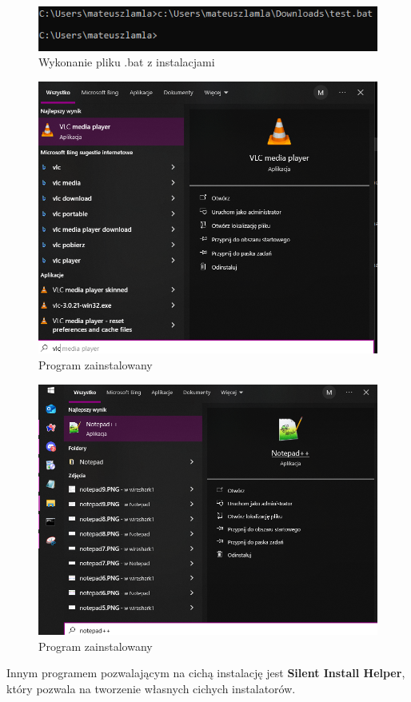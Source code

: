 \documentclass[0.82pt,a4paper]{article}
\begin{document}
    \begin{figure}[H]
        \centering
        \includegraphics[width=0.8\linewidth]{media/USSF/4.PNG}
        \caption[]{Wykonanie pliku .bat z instalacjami}
        \label{fig:ussf_wykonanie_bat}
    \end{figure}

    \begin{figure}[H]
        \centering
        \includegraphics[width=0.8\linewidth]{media/USSF/5.PNG}
        \caption[]{Program zainstalowany}
        \label{fig:ussf_vlc_zainstalowane}
    \end{figure}

    \begin{figure}[H]
        \centering
        \includegraphics[width=0.8\linewidth]{media/USSF/6.PNG}
        \caption[]{Program zainstalowany}
        \label{fig:ussf_notepad++_zainstalowany}
    \end{figure}
\newpage    
    Innym programem pozwalającym na cichą instalację jest \textbf{Silent Install Helper}, który pozwala na tworzenie własnych cichych instalatorów.
\end{document}
